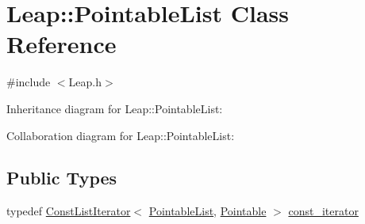\hypertarget{class_leap_1_1_pointable_list}{}\section{Leap\+:\+:Pointable\+List Class Reference}
\label{class_leap_1_1_pointable_list}


{\ttfamily \#include $<$Leap.\+h$>$}



Inheritance diagram for Leap\+:\+:Pointable\+List\+:


Collaboration diagram for Leap\+:\+:Pointable\+List\+:
\subsection*{Public Types}
\begin{DoxyCompactItemize}
\item 
typedef \hyperlink{class_leap_1_1_const_list_iterator}{Const\+List\+Iterator}$<$ \hyperlink{class_leap_1_1_pointable_list}{Pointable\+List}, \hyperlink{class_leap_1_1_pointable}{Pointable} $>$ \hyperlink{class_leap_1_1_pointable_list_a12b640b8c7e70885884a3a6ee903c21c}{const\+\_\+iterator}
\end{DoxyCompactItemize}

